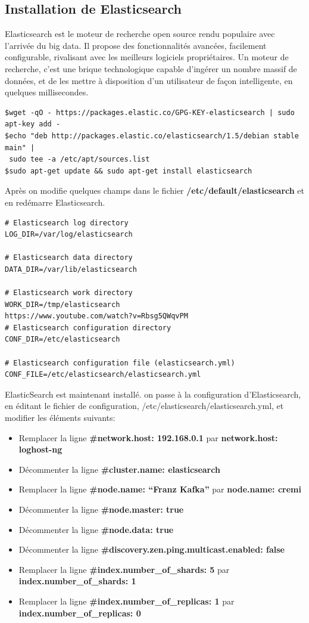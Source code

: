 \documentclass[11pt,a4paper]{article}
\begin{document}
\subsection{Installation de Elasticsearch}
Elasticsearch est le moteur de recherche open source rendu populaire avec l'arrivée du big data. Il propose des fonctionnalités avancées, facilement configurable, rivalisant avec les meilleurs logiciels propriétaires. Un moteur de recherche, c'est une brique technologique capable d'ingérer un nombre massif de données, et de les mettre à disposition d'un utilisateur de façon intelligente, en quelques millisecondes. 
 \begin{verbatim}
$wget -qO - https://packages.elastic.co/GPG-KEY-elasticsearch | sudo apt-key add -
$echo "deb http://packages.elastic.co/elasticsearch/1.5/debian stable main" | 
 sudo tee -a /etc/apt/sources.list
$sudo apt-get update && sudo apt-get install elasticsearch
 \end{verbatim}
Après on modifie quelques champs dans le fichier  \textbf{/etc/default/elasticsearch} et en redémarre Elasticsearch.

\begin{verbatim}
# Elasticsearch log directory
LOG_DIR=/var/log/elasticsearch

# Elasticsearch data directory
DATA_DIR=/var/lib/elasticsearch

# Elasticsearch work directory
WORK_DIR=/tmp/elasticsearch
https://www.youtube.com/watch?v=Rbsg5QWqvPM
# Elasticsearch configuration directory
CONF_DIR=/etc/elasticsearch

# Elasticsearch configuration file (elasticsearch.yml)
CONF_FILE=/etc/elasticsearch/elasticsearch.yml
\end{verbatim}

ElasticSearch est maintenant installé. on passe à la configuration d'Elasticsearch, en éditant le fichier de configuration, /etc/elasticsearch/elasticsearch.yml, et modifier les éléments suivants:


\begin{itemize}
\item Remplacer la ligne \textbf{\#network.host: 192.168.0.1} par \textbf{network.host: loghost-ng}
\item Décommenter la ligne \textbf{\#cluster.name: elasticsearch} 
\item Remplacer la ligne \textbf{\#node.name: “Franz Kafka”} par \textbf{node.name: cremi}
\item Décommenter la ligne \textbf{\#node.master: true}
\item Décommenter la ligne \textbf{\#node.data: true}
\item Décommenter la ligne \textbf{\#discovery.zen.ping.multicast.enabled: false}
\item Remplacer la ligne \textbf{\#index.number\_of\_shards: 5} par \textbf{index.number\_of\_shards: 1}
\item Remplacer la ligne \textbf{\#index.number\_of\_replicas: 1} par \textbf{index.number\_of\_replicas: 0}

\end{itemize}
\end{document}
